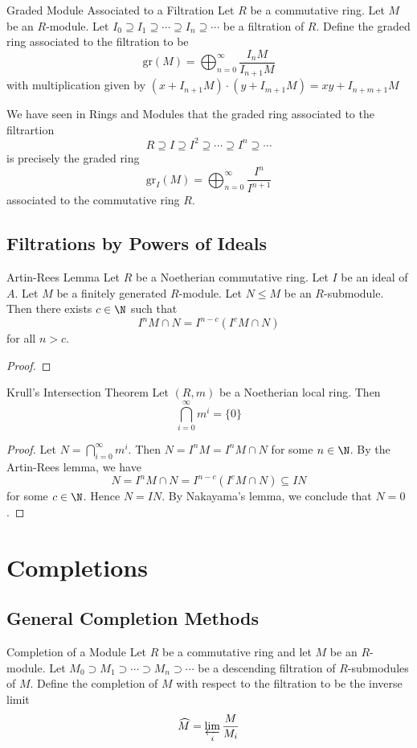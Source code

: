 \documentclass[a4paper]{article}
\begin{document}
\begin{defn}{Graded Module Associated to a Filtration}{} Let $R$ be a commutative ring. Let $M$ be an $R$-module. Let $I_0\supseteq I_1\supseteq\cdots\supseteq I_n\supseteq\cdots$ be a filtration of $R$. Define the graded ring associated to the filtration to be $$\text{gr}(M)=\bigoplus_{n=0}^\infty\frac{I_nM}{I_{n+1}M}$$ with multiplication given by $(x+I_{n+1}M)\cdot(y+I_{m+1}M)=xy+I_{n+m+1}M$
\end{defn}

We have seen in Rings and Modules that the graded ring associated to the filtrartion $$R\supseteq I\supseteq I^2\supseteq\cdots\supseteq I^n\supseteq\cdots$$ is precisely the graded ring $$\text{gr}_I(M)=\bigoplus_{n=0}^\infty\frac{I^n}{I^{n+1}}$$ associated to the commutative ring $R$. 

\subsection{Filtrations by Powers of Ideals}
\begin{thm}{Artin-Rees Lemma}{} Let $R$ be a Noetherian commutative ring. Let $I$ be an ideal of $A$. Let $M$ be a finitely generated $R$-module. Let $N\leq M$ be an $R$-submodule. Then there exists $c\in\N$ such that $$I^nM\cap N=I^{n-c}(I^cM\cap N)$$ for all $n>c$. \tcbline
\begin{proof}

\end{proof}
\end{thm}

\begin{thm}{Krull's Intersection Theorem}{} Let $(R,m)$ be a Noetherian local ring. Then $$\bigcap_{i=0}^\infty m^i=\{0\}$$ \tcbline
\begin{proof}
Let $N=\bigcap_{i=0}^\infty m^i$. Then $N=I^nM=I^nM\cap N$ for some $n\in\N$. By the Artin-Rees lemma, we have $$N=I^nM\cap N=I^{n-c}(I^cM\cap N)\subseteq IN$$ for some $c\in\N$. Hence $N=IN$. By Nakayama's lemma, we conclude that $N=0$. 
\end{proof}
\end{thm}

\pagebreak
\section{Completions}
\subsection{General Completion Methods}
\begin{defn}{Completion of a Module}{} Let $R$ be a commutative ring and let $M$ be an $R$-module. Let $M_0\supset M_1\supset\cdots\supset M_n\supset\cdots$ be a descending filtration of $R$-submodules of $M$. Define the completion of $M$ with respect to the filtration to be the inverse limit $$\widehat{M}=\varprojlim_i\frac{M}{M_i}$$
\end{defn}
\end{document}
